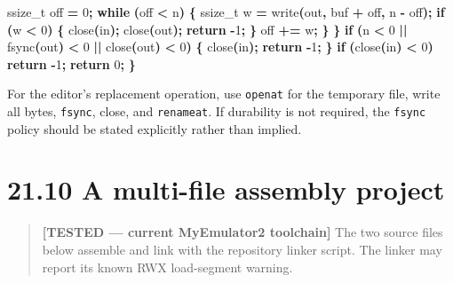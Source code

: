 \documentclass[
  oneside,
  openany]{book}
\newenvironment{Shaded}{\begin{snugshade}}{\end{snugshade}}
\newcommand{\ControlFlowTok}[1]{\textcolor[rgb]{0.13,0.29,0.53}{\textbf{#1}}}
\newcommand{\DataTypeTok}[1]{\textcolor[rgb]{0.13,0.29,0.53}{#1}}
\newcommand{\DecValTok}[1]{\textcolor[rgb]{0.00,0.00,0.81}{#1}}
\newcommand{\NormalTok}[1]{#1}
\newcommand{\OperatorTok}[1]{\textcolor[rgb]{0.81,0.36,0.00}{\textbf{#1}}}
\begin{document}
\begin{Shaded}
\begin{Highlighting}[]
        \DataTypeTok{ssize\_t}\NormalTok{ off }\OperatorTok{=} \DecValTok{0}\OperatorTok{;}
        \ControlFlowTok{while} \OperatorTok{(}\NormalTok{off }\OperatorTok{\textless{}}\NormalTok{ n}\OperatorTok{)} \OperatorTok{\{} \DataTypeTok{ssize\_t}\NormalTok{ w }\OperatorTok{=}\NormalTok{ write}\OperatorTok{(}\NormalTok{out}\OperatorTok{,}\NormalTok{ buf }\OperatorTok{+}\NormalTok{ off}\OperatorTok{,}\NormalTok{ n }\OperatorTok{{-}}\NormalTok{ off}\OperatorTok{);}
            \ControlFlowTok{if} \OperatorTok{(}\NormalTok{w }\OperatorTok{\textless{}} \DecValTok{0}\OperatorTok{)} \OperatorTok{\{}\NormalTok{ close}\OperatorTok{(}\NormalTok{in}\OperatorTok{);}\NormalTok{ close}\OperatorTok{(}\NormalTok{out}\OperatorTok{);} \ControlFlowTok{return} \OperatorTok{{-}}\DecValTok{1}\OperatorTok{;} \OperatorTok{\}}\NormalTok{ off }\OperatorTok{+=}\NormalTok{ w}\OperatorTok{;} \OperatorTok{\}}
    \OperatorTok{\}}
    \ControlFlowTok{if} \OperatorTok{(}\NormalTok{n }\OperatorTok{\textless{}} \DecValTok{0} \OperatorTok{||}\NormalTok{ fsync}\OperatorTok{(}\NormalTok{out}\OperatorTok{)} \OperatorTok{\textless{}} \DecValTok{0} \OperatorTok{||}\NormalTok{ close}\OperatorTok{(}\NormalTok{out}\OperatorTok{)} \OperatorTok{\textless{}} \DecValTok{0}\OperatorTok{)} \OperatorTok{\{}\NormalTok{ close}\OperatorTok{(}\NormalTok{in}\OperatorTok{);} \ControlFlowTok{return} \OperatorTok{{-}}\DecValTok{1}\OperatorTok{;} \OperatorTok{\}}
    \ControlFlowTok{if} \OperatorTok{(}\NormalTok{close}\OperatorTok{(}\NormalTok{in}\OperatorTok{)} \OperatorTok{\textless{}} \DecValTok{0}\OperatorTok{)} \ControlFlowTok{return} \OperatorTok{{-}}\DecValTok{1}\OperatorTok{;}
    \ControlFlowTok{return} \DecValTok{0}\OperatorTok{;}
\OperatorTok{\}}
\end{Highlighting}
\end{Shaded}

For the editor's replacement operation, use \texttt{openat} for the
temporary file, write all bytes, \texttt{fsync}, close, and
\texttt{renameat}. If durability is not required, the \texttt{fsync}
policy should be stated explicitly rather than implied.

\hypertarget{a-multi-file-assembly-project}{%
\section{21.10 A multi-file assembly
project}\label{a-multi-file-assembly-project}}

\begin{quote}
\textbf{{[}TESTED --- current MyEmulator2 toolchain{]}} The two source
files below assemble and link with the repository linker script. The
linker may report its known RWX load-segment warning.
\end{quote}
\end{document}
